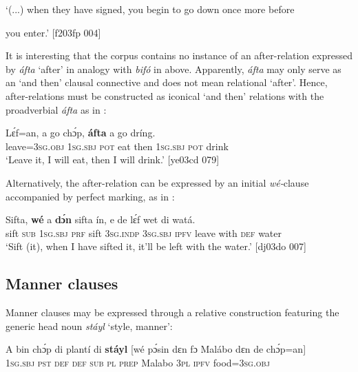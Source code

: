\glt ‘(...) when they have signed, you begin to go down once more before 


\glt you enter.’ [f203fp 004]
\z

It is interesting that the corpus contains no instance of an after-relation expressed by \textit{áfta} ‘after’ in analogy with \textit{bifó} in  above. Apparently, \textit{áfta} may only serve as an ‘and then’ clausal connective and does not mean relational ‘after’. Hence, after-relations must be constructed as iconical ‘and then’ relations with the proadverbial \textit{áfta} as in :


\ea%
    \label{ex:key:1478}
    \gll Lɛ́f=an,    a    go  chɔ́p,  \textbf{áfta}    a    go  dríng.\\
leave=\textsc{3sg.obj}  \textsc{1sg.sbj}  \textsc{pot}  eat    then  \textsc{1sg.sbj}  \textsc{pot}  drink\\

\glt ‘Leave it, I will eat, then I will drink.’ [ye03cd 079]
\z

Alternatively, the after-relation can be expressed by an initial \textit{wé-}clause accompanied by perfect marking, as in :


\ea%
    \label{ex:key:1479}
    \gll Sifta,  \textbf{wé}  a    \textbf{dɔ́n}  sifta    ín,    e    de  lɛ́f    wet    di  watá.\\
sift    \textsc{sub}  \textsc{1sg.sbj}  \textsc{prf}  sift    \textsc{3sg.indp}  \textsc{3sg.sbj}  \textsc{ipfv}  leave  with    \textsc{def}  water\\

\glt ‘Sift (it), when I have sifted it, it’ll be left with the water.’ [dj03do 007]
\z

\subsection{Manner clauses}\label{sec:10.7.4}

Manner clauses may be expressed through a relative construction featuring the generic head noun \textit{stáyl} ‘style, manner’:


\ea%
    \label{ex:key:1480}
    \gll \MakeUppercase{A}   bin  chɔ́p  di  plantí  di  \textbf{stáyl}  [wé  pɔ́sin  dɛn
fɔ  Malábo  dɛn  de  chɔ́p=an]\\
\textsc{1sg.sbj} \textsc{pst}  \textsc{def}  \textsc{def}  \phantom{[}\textsc{sub}  \textsc{pl} 
\textsc{prep}  Malabo  \textsc{3pl}  \textsc{ipfv}  food=\textsc{3sg.obj}\\

